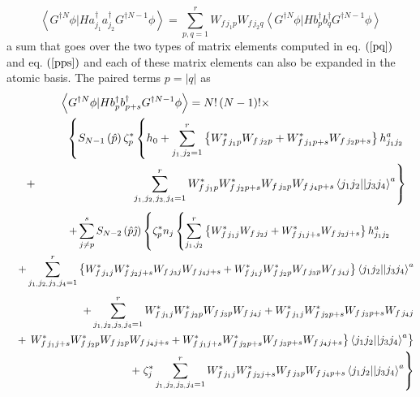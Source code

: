 \documentclass{article}
\begin{document}
\begin{equation}
\left\langle G^{\dagger N}\phi |Ha_{j_{1}}^{\dagger }a_{j_{2}}^{\dagger
}G^{\dagger N-1}\phi \right\rangle
=\sum_{p,q=1}^{r}W_{f\,j_{1}p}W_{f\,j_{2}q}\left\langle G^{\dagger N}\phi
|Hb_{p}^{\dagger }b_{q}^{\dagger }G^{\dagger N-1}\phi \right\rangle
\label{ftrm}
\end{equation}%
a sum that goes over the two types of matrix elements computed in eq. $%
\left( \ref{pq}\right) $ and eq. $\left( \ref{pps}\right) $ and each of
these matrix elements can also be expanded in the atomic basis. The paired
terms $p=\left| q\right| $ as%
\begin{eqnarray}
&&\left\langle G^{\dagger N}\phi |Hb_{p}^{\dagger }b_{p+s}^{\dagger
}G^{\dagger N-1}\phi \right\rangle =N!\left( N-1\right) !\times \qquad
\qquad \qquad \qquad \qquad \qquad  \notag \\
&&\left\{ S_{N-1}\left( \hat{p}\right) \zeta _{p}^{\ast }\left\{
h_{0}+\sum_{j_{1,}j_{2}=1}^{r}\left\{ W_{f\,j_{1}p}^{\ast
}W_{f\,j_{2}p}+W_{f\,j_{1}p+s}^{\ast }W_{f\,j_{2}p+s}\right\}
h_{j_{1}j_{2}}^{a}\right. \right.  \notag \\
&&+\left. {}\right. \qquad \qquad \qquad \qquad \left.
\sum_{j_{1,}j_{2,}j_{3,}j_{4}=1}^{r}W_{f\,j_{1}p}^{\ast
}W_{f\,j_{2}p+s}^{\ast }W_{f\,j_{3}p}W_{f\,j_{4}p+s}\left\langle
j_{1}j_{2}||j_{3}j_{4}\right\rangle ^{a}\right\}
\end{eqnarray}%
\begin{eqnarray}
&&+\sum_{j\neq p}^{s}S_{N-2}\left( \hat{p}\hat{\jmath}\right) \left\{ \zeta
_{p}^{\ast }n_{j}\left\{ \sum_{j_{1},j_{2}}^{r}\left\{ W_{f\,j_{1}j}^{\ast
}W_{f\,j_{2}j}+W_{f\,j_{1}j+s}^{\ast }W_{f\,j_{2}j+s}\right\}
h_{j_{1}j_{2}}^{a}\right. \right. \qquad  \notag \\
&&+\sum_{j_{1,}j_{2,}j_{3,}j_{4}=1}^{r}\left\{ W_{f\,j_{1}j}^{\ast
}W_{f\,j_{2}j+s}^{\ast }W_{f\,j_{3}j}W_{f\,j_{4}j+s}+W_{f\,j_{1}j}^{\ast
}W_{f\,j_{2}p}^{\ast }W_{f\,j_{3}p}W_{f\,j_{4}j}\right\} \left\langle
j_{1}j_{2}||j_{3}j_{4}\right\rangle ^{a}
\end{eqnarray}%
\begin{eqnarray}
&&+\sum_{j_{1,}j_{2,}j_{3,}j_{4}=1}^{r}W_{f\,j_{1}j}^{\ast
}W_{f\,j_{2}p}^{\ast }W_{f\,j_{3}p}W_{f\,j_{4}j}+W_{f\,j_{1}j}^{\ast
}W_{f\,j_{2}p+s}^{\ast }W_{f\,j_{3}p+s}W_{f\,j_{4}j}  \notag \\
&&+\left. \left. W_{f\,j_{1}j+s}^{\ast }W_{f\,j_{2}p}^{\ast
}W_{f\,j_{3}p}W_{f\,j_{4}j+s}+W_{f\,j_{1}j+s}^{\ast }W_{f\,j_{2}p+s}^{\ast
}W_{f\,j_{3}p+s}W_{f\,j_{4}j+s}\right\} \left\langle
j_{1}j_{2}||j_{3}j_{4}\right\rangle ^{a}\right\}  \notag \\
&&\qquad \qquad \qquad \qquad +\left. \zeta _{j}^{\ast
}\sum_{j_{1,}j_{2,}j_{3,}j_{4}=1}^{r}W_{f\,j_{1}j}^{\ast
}W_{f\,j_{2}j+s}^{\ast }W_{f\,j_{3}p}W_{f\,j_{4}p+s}\left\langle
j_{1}j_{2}||j_{3}j_{4}\right\rangle ^{a}\right\}
\end{eqnarray}%
\end{document}
